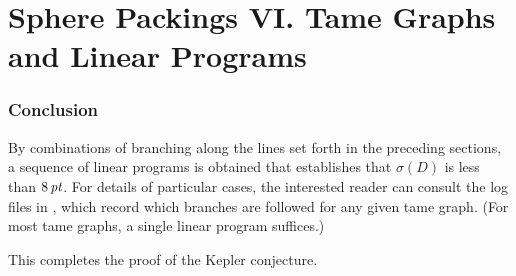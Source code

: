 \documentclass[onecolumn]{newsiambook}
\def\shortversion#1{#1}
\def\longversion#1{}
\def\shortversion#1{}
\def\longversion#1{#1}
\begin{document}

\longversion{
    \part{Sphere Packings VI. Tame Graphs and Linear Programs}
    \label{part:tame}
    
    
    
    
    }

\shortversion{
    \label{part:tame}
    
    
    }

\section{Conclusion}

By combinations of branching along the lines set forth in the
preceding sections, a sequence of linear programs is obtained that
establishes that  $\sigma(D)$ is less than $8\,\hbox{\it pt}$.  For details
of particular cases, the interested reader can consult the log
files in \cite{web}, which record which branches are followed for
any given tame graph.  (For most tame graphs, a single linear
program suffices.)

\smallskip

This completes the \shortversion{(abridged)} proof of the Kepler
conjecture.


\backmatter



\printindex
\end{document}
